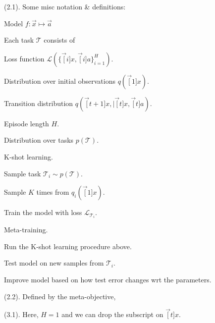 \documentclass[11pt]{article}
\begin{document}
 (2.1). Some misc notation \& definitions:
\begin{compactitem}
	\item Model $f: \vec x \mapsto \vec a$
	
	\item Each task $\mathcal T$ consists of 
	\begin{compactitem}
		\item Loss function $\mathcal{L}(  \{ \vec[i]{x}, \vec[i]{a} \}_{i=1}^{H} )$.
		\item Distribution over initial observations $ q(\vec[1]{x})$.
		\item Transition distribution $q(\vec[t+1]{x}, \mid \vec[t]{x}, \vec[t]{a})$. 
		\item Episode length $H$.
	\end{compactitem} 

	\item Distribution over tasks $p(\mathcal T)$. 
	
	\item K-shot learning.
	\begin{compactenum}
		\item Sample task $\mathcal{T}_i \sim p(\mathcal T)$. 
		\item Sample $K$ times from $q_i(\vec[1]{x})$. 
		\item Train the model with loss $\mathcal{L}_{\mathcal{T}_i}$.  
	\end{compactenum}

	\item Meta-training. 
	\begin{compactenum}
		\item Run the K-shot learning procedure above. 
		\item Test model on new samples from $\mathcal{T}_i$. 
		\item Improve model based on how test error changes wrt the parameters. 
	\end{compactenum}
\end{compactitem}

 (2.2). Defined by the meta-objective,


 (3.1). Here, $H = 1$ and we can drop the subscript on $\vec[t]{x}$. 
\end{document}
